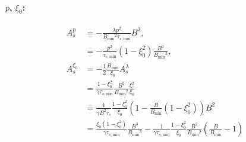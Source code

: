 \documentclass[11pt,a4paper]{article}
\newcommand{\sub}[1]{\ensuremath{_{\text{#1}}}}
\begin{document}
\paragraph{$p$, $\xi_0$:}
\begin{align}
A_s^p%
&= -\frac{\lambda p^2}{B\sub{min}^2\tau_{s,\text{min}}}B^3, \nonumber \\
&= -\frac{p^2}{\tau_{s,\text{min}}} (1-\xi_0^2)\frac{B^3}{B\sub{min}^3}, \nonumber \\
A_s^{\xi_0} &= -\frac{1}{2}\frac{B\sub{min}}{\xi_0}A_s^{\lambda} \nonumber \\
&= \frac{1-\xi_0^2}{\gamma\tau_{s,\text{min}}} \frac{B^2}{B\sub{min}^2}\frac{\xi^2}{\xi_0} \nonumber \\
&= \frac{1}{\gamma B^2 \tau_s} \frac{1-\xi_0^2}{\xi_0} \left(1-\frac{B}{B\sub{min}}(1-\xi_0^2)\right) B^2\nonumber \\
&= \frac{ \xi_0(1-\xi_0^2)}{\gamma \tau_{s,\text{min}}} \frac{B^3}{B\sub{min}^3} -  \frac{1}{\gamma \tau_{s,\text{min}}}\frac{1-\xi_0^2}{\xi_0}\frac{B^2}{B\sub{min}^2}\left(\frac{B}{B\sub{min}}-1\right) 
\end{align}
\end{document}
